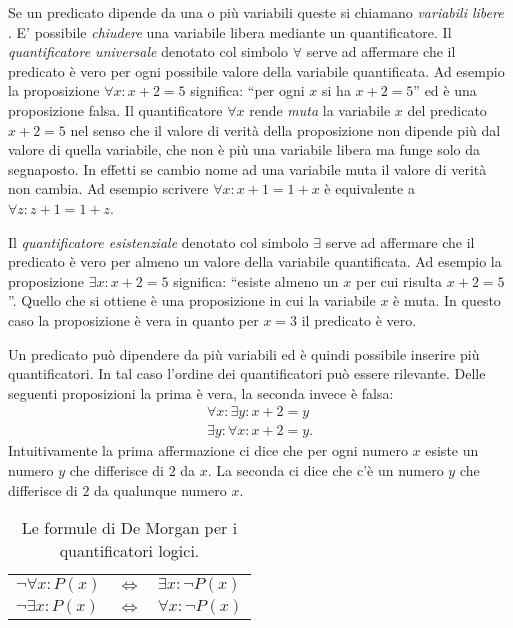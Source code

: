 Se un predicato dipende da una o più variabili queste
si chiamano \emph{variabili libere}%
%
. E' possibile
\emph{chiudere} una variabile libera mediante un quantificatore.
Il \emph{quantificatore universale}%
%
 denotato col simbolo
$\forall$ serve ad affermare che il predicato è vero
per ogni possibile valore della variabile quantificata.
Ad esempio la proposizione $\forall x\colon x+2=5$ significa:
``per ogni $x$ si ha $x+2=5$'' ed è una proposizione falsa.
Il quantificatore $\forall x$ rende \emph{muta} la variabile
$x$ del predicato $x+2=5$ nel senso che il valore di verità 
della proposizione
non dipende più dal valore di quella variabile, che non è
più una variabile libera ma funge solo da segnaposto.
In effetti se cambio nome ad una variabile muta il valore 
di verità non cambia. Ad esempio scrivere $\forall x\colon x+1=1+x$
è equivalente a $\forall z\colon z+1=1+z$.

Il \emph{quantificatore esistenziale}%
%
 denotato col simbolo
$\exists$ serve ad affermare che il predicato è vero per
almeno un valore della variabile quantificata.
Ad esempio la proposizione $\exists x\colon x+2=5$ significa:
``esiste almeno un $x$ per cui risulta $x+2=5$''.
Quello che si ottiene è una proposizione in cui la variabile
$x$ è muta. In questo caso la proposizione è vera in quanto
per $x=3$ il predicato è vero.

Un predicato può dipendere da più variabili ed è quindi
possibile inserire più quantificatori. In tal caso l'ordine
dei quantificatori può essere rilevante.
Delle seguenti proposizioni la prima è vera, la seconda
invece è falsa:
\begin{gather*}
\forall x\colon \exists y\colon x+2=y \\
\exists y\colon \forall x\colon x+2=y.
\end{gather*}
Intuitivamente la prima affermazione ci dice che per ogni numero $x$ 
esiste un numero $y$ che differisce di $2$ da $x$.
La seconda ci dice che c'è un numero $y$ che differisce di $2$ 
da qualunque numero $x$.

\begin{table}
  \begin{center}
    \begin{tabular}{lcl}
    $\lnot \forall x \colon P(x)$ & $\iff$ & $\exists x \colon \lnot P(x)$\\
    $\lnot \exists x \colon P(x)$ & $\iff$ & $\forall x \colon \lnot P(x)$\\
    \end{tabular}
  \end{center}
  \caption{Le formule di De Morgan per i quantificatori logici.}
  \label{tab:proprieta_quantificatori}
\end{table}

